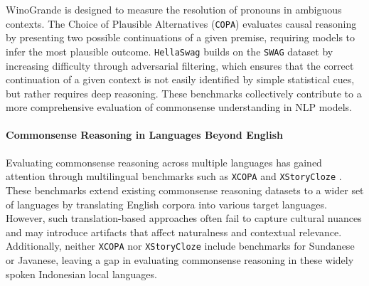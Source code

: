WinoGrande \citep{sakaguchi2021winogrande} is designed to measure the resolution of pronouns in ambiguous contexts. The Choice of Plausible Alternatives (\texttt{COPA}) \citep{gordon-etal-2012-semeval} evaluates causal reasoning by presenting two possible continuations of a given premise, requiring models to infer the most plausible outcome. \texttt{HellaSwag} \citep{zellers-etal-2019-hellaswag} builds on the \texttt{SWAG} \cite{zellers-etal-2018-swag} dataset by increasing difficulty through adversarial filtering, which ensures that the correct continuation of a given context is not easily identified by simple statistical cues, but rather requires deep reasoning. These benchmarks collectively contribute to a more comprehensive evaluation of commonsense understanding in NLP models.


\paragraph{Commonsense Reasoning in Languages Beyond English}

Evaluating commonsense reasoning across multiple languages has gained attention through multilingual benchmarks such as \texttt{XCOPA} \citep{ponti-etal-2020-xcopa} and \texttt{XStoryCloze} \citep{lin-etal-2022-shot}. These benchmarks extend existing commonsense reasoning datasets to a wider set of languages by translating English corpora into various target languages. However, such translation-based approaches often fail to capture cultural nuances and may introduce artifacts that affect naturalness and contextual relevance. Additionally, neither \texttt{XCOPA} nor \texttt{XStoryCloze} include benchmarks for Sundanese or Javanese, leaving a gap in evaluating commonsense reasoning in these widely spoken Indonesian local languages.


